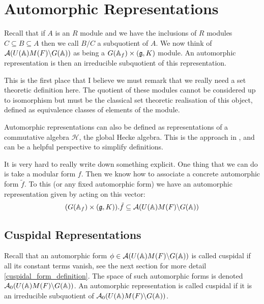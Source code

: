 \section{Automorphic Representations}
Recall that if \(A\) is an \(R\) module and we have the inclusions of \(R\) modules \(C \subseteq B \subseteq A\) then we call \(B/C\) a subquotient of \(A\). We now think of \(\mathcal{A}(U(\A)M(F)\backslash G(\A))\) as being a \(G(\A_f)\times (\mathfrak{g}, K)\) module. An automorphic representation is then an irreducible subquotient of this representation.
\begin{remark}
    This is the first place that I believe we must remark that we really need a set theoretic definition here. The quotient of these modules cannot be considered up to isomorphism but must be the classical set theoretic realisation of this object, defined as equivalence classes of elements of the module.
\end{remark}

\begin{remark}
    Automorphic representations can also be defined as representations of a commutative algebra \(\mathcal{H}\), the global Hecke algebra. This is the approach in \cite[I.II(4.6)]{borelAutomorphicFormsRepresentations1979}, and can be a helpful perspective to simplify definitions. 
\end{remark}

\begin{example}
    It is very hard to really write down something explicit. One thing that we can do is take a modular form \(f\). Then we know how to associate a concrete automorphic form \(\tilde{f}\). To this (or any fixed automorphic form) we have an automorphic representation given by acting on this vector:
    \[(G(\A_f)\times (\mathfrak{g}, K)).\tilde{f} \subseteq \mathcal{A}(U(\A)M(F)\backslash G(\A))\]
\end{example}

\subsection{Cuspidal Representations}
Recall that an automorphic form \(\phi\in \mathcal{A}(U(\A)M(F) \backslash G(\A))\) is called cuspidal  if all its constant terms vanish, see the next section for more detail \ref{cuspidal_form_definition}.
The space of such automorphic forms is denoted \(\mathcal{A}_0(U(\A)M(F) \backslash G(\A))\). An automorphic representation is called cuspidal if it is an irreducible subquotient of \(\mathcal{A}_0(U(\A)M(F) \backslash G(\A))\).

